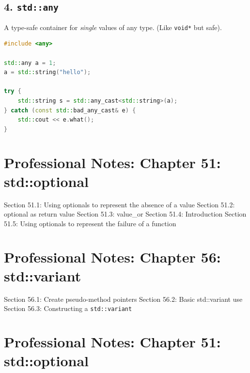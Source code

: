 \hypertarget{stdany}{%
\subsection{\texorpdfstring{4.
\texttt{std::any}}{4. std::any}}\label{stdany}}

A type-safe container for \emph{single} values of any type. (Like
\passthrough{\lstinline!void*!} but safe).

\begin{lstlisting}[language={C++}]
#include <any>

std::any a = 1;
a = std::string("hello");

try {
    std::string s = std::any_cast<std::string>(a);
} catch (const std::bad_any_cast& e) {
    std::cout << e.what();
}
\end{lstlisting}

\hypertarget{professional-notes-chapter-51-stdoptional}{%
\section{Professional Notes: Chapter 51:
std::optional}\label{professional-notes-chapter-51-stdoptional}}

Section 51.1: Using optionals to represent the absence of a value
Section 51.2: optional as return value Section 51.3: value\_or Section
51.4: Introduction Section 51.5: Using optionals to represent the
failure of a function

\hypertarget{professional-notes-chapter-56-stdvariant}{%
\section{Professional Notes: Chapter 56:
std::variant}\label{professional-notes-chapter-56-stdvariant}}

Section 56.1: Create pseudo-method pointers Section 56.2: Basic
std::variant use Section 56.3: Constructing a
\passthrough{\lstinline!std::variant!}

\hypertarget{professional-notes-chapter-51-stdoptional-1}{%
\section{Professional Notes: Chapter 51:
std::optional}\label{professional-notes-chapter-51-stdoptional-1}}


